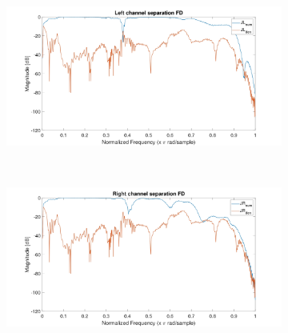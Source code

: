 \documentclass[12pt,a4paper,titlepage]{article}
\begin{document}
\begin{figure}[h]
\begin{subfigure}{1\textwidth}
	\includegraphics[width=1\textwidth]{Immagini/left_channel_separation_FD}
	\caption{}
	\label{left_channel_separation_FD}
\end{subfigure}\\
\begin{subfigure}{1\textwidth}
	\includegraphics[width=1\textwidth]{Immagini/right_channel_separation_FD}
	\caption{}
	\label{right_channel_separation_FD}
\end{subfigure}
\end{figure}
\end{document}
